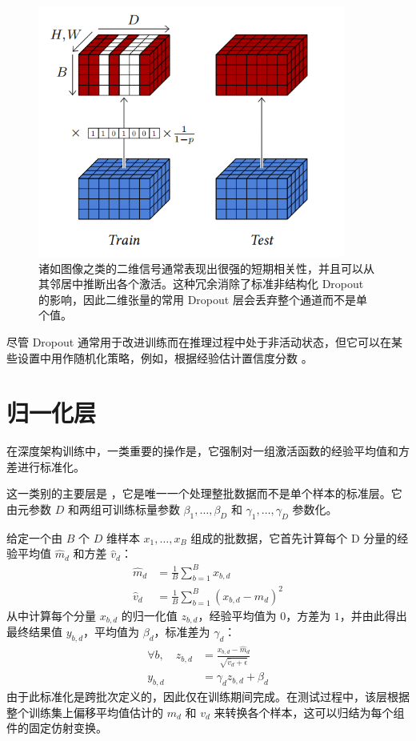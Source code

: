 \begin{figure}
    \centering
    \includegraphics[width=0.9\textwidth]{fig/fig4.8.png}
    \caption[二维 Dropout]{诸如图像之类的二维信号通常表现出很强的短期相关性，并且可以从其邻居中推断出各个激活。这种冗余消除了标准非结构化 Dropout 的影响，因此二维张量的常用 Dropout 层会丢弃整个通道而不是单个值。}
    \label{fig4.8}
\end{figure}

尽管 Dropout 通常用于改进训练而在推理过程中处于非活动状态，但它可以在某些设置中用作随机化策略，例如，根据经验估计置信度分数 \citep{arxiv-1506.02142}。

\section{归一化层}\label{sec4.6}

在深度架构训练中，一类重要的操作是，它强制对一组激活函数的经验平均值和方差进行标准化。

这一类别的主要层是 \citep{icml43442}，它是唯一一个处理整批数据而不是单个样本的标准层。它由元参数 $D$ 和两组可训练标量参数 $\beta_1,\dots,\beta_D$ 和 $\gamma_1,\dots,\gamma_D$ 参数化。

给定一个由 $B$ 个 $D$ 维样本 $x_1,\dots,x_B$ 组成的批数据，它首先计算每个 D 分量的经验平均值 $\hat{m}_d$ 和方差 $\hat{v}_d$：
\begin{align*}
    \hat{m}_d &= \frac{1}{B}\sum_{b=1}^{B}x_{b,d} \\
    \hat{v}_d &= \frac{1}{B}\sum_{b=1}^{B}(x_{b,d}-\hat{m}_d)^2
\end{align*}
从中计算每个分量 $x_{b,d}$ 的归一化值 $z_{b,d}$，经验平均值为 $0$，方差为 $1$，并由此得出最终结果值 $y_{b,d}$，平均值为 $\beta_d$，标准差为 $\gamma_d$：
\begin{align*}
    \forall b, \quad z_{b,d} &= \frac{x_{b,d}-\hat{m}_d}{\sqrt{\hat{v}_d+\epsilon}}\\
    y_{b,d} &= \gamma_dz_{b,d}+\beta_d
\end{align*}
由于此标准化是跨批次定义的，因此仅在训练期间完成。在测试过程中，该层根据整个训练集上偏移平均值估计的 $m_d$ 和 $v_d$ 来转换各个样本，这可以归结为每个组件的固定仿射变换。

